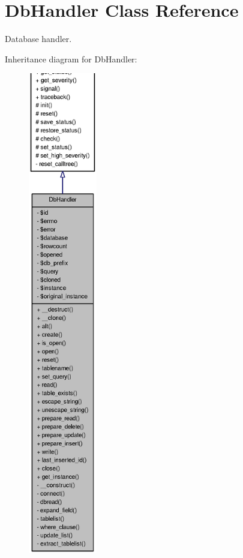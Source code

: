\section{DbHandler Class Reference}
\label{classDbHandler}


Database handler.  




Inheritance diagram for DbHandler:\nopagebreak
\begin{figure}[H]
\begin{center}
\leavevmode
\includegraphics[height=600pt]{classDbHandler__inherit__graph}
\end{center}
\end{figure}


